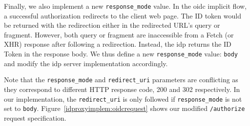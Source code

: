 Finally, we also implement a new \texttt{response\_mode} value.
In the \gls{oidc} implicit flow, a successful authorization redirects to the client web page.
The ID token would be returned with the redirection either in the redirected URL's query or fragment.
However, both query or fragment are inaccessible from a Fetch (or XHR) response after following a redirection. 
Instead, the \gls{idp} returns the ID Token in the response body.
We thus define a new \texttt{response\_mode} value: \texttt{body} and modify the \gls{idp} server implementation accordingly.

Note that the \texttt{response\_mode} and \texttt{redirect\_uri} parameters are conflicting as they correspond to different HTTP response code, 200 and 302 respectively.
In our implementation, the \texttt{redirect\_uri} is only followed if \texttt{response\_mode} is not set to \texttt{body}.
Figure~\ref{idproxyimplem:oidcrequest} shows our modified \texttt{/authorize} request specification.

